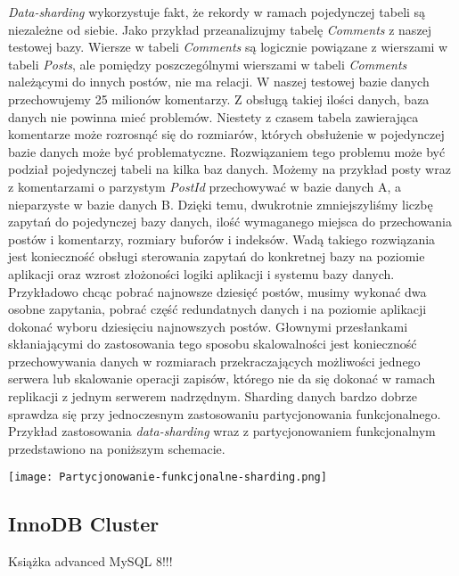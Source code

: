 \textit{Data-sharding} wykorzystuje fakt, że rekordy w ramach pojedynczej tabeli są niezależne od siebie. Jako przykład przeanalizujmy tabelę \textit{Comments} z naszej testowej bazy.
Wiersze w tabeli \textit{Comments} są logicznie powiązane z wierszami w tabeli \textit{Posts}, ale pomiędzy poszczególnymi wierszami w tabeli \textit{Comments} należącymi do innych postów, nie ma relacji. W naszej testowej bazie danych przechowujemy 25 milionów komentarzy. Z obsługą takiej ilości danych, baza danych nie powinna mieć problemów. Niestety z czasem tabela zawierająca komentarze może rozrosnąć się do rozmiarów, których obsłużenie w pojedynczej bazie danych może być problematyczne. Rozwiązaniem tego problemu może być podział pojedynczej tabeli na kilka baz danych. Możemy na przykład posty wraz z komentarzami o parzystym \textit{PostId} przechowywać w bazie danych A, a nieparzyste w bazie danych B. Dzięki temu, dwukrotnie zmniejszyliśmy liczbę zapytań do pojedynczej bazy danych, ilość wymaganego miejsca do przechowania postów i komentarzy, rozmiary buforów i indeksów. Wadą takiego rozwiązania jest konieczność obsługi sterowania zapytań do konkretnej bazy na poziomie aplikacji oraz wzrost złożoności logiki aplikacji i systemu bazy danych. Przykładowo chcąc pobrać najnowsze dziesięć postów, musimy wykonać dwa osobne zapytania, pobrać część redundatnych danych i na poziomie aplikacji dokonać wyboru dziesięciu najnowszych postów.
Głownymi przesłankami skłaniającymi do zastosowania tego sposobu skalowalności jest konieczność przechowywania danych w rozmiarach przekraczających możliwości jednego serwera lub skalowanie operacji zapisów, którego nie da się dokonać w ramach replikacji z jednym serwerem nadrzędnym. Sharding danych bardzo dobrze sprawdza się przy jednoczesnym zastosowaniu partycjonowania funkcjonalnego. Przykład zastosowania \textit{data-sharding} wraz z partycjonowaniem funkcjonalnym przedstawiono na poniższym schemacie.
\begin{center}
	\texttt{[image: Partycjonowanie-funkcjonalne-sharding.png]} 
\end{center}

\subsection{InnoDB Cluster}
Książka advanced MySQL 8!!!

